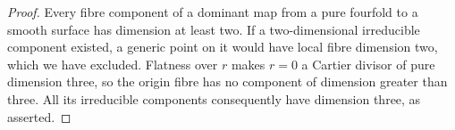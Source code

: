 \begin{proof}
Every fibre component of a dominant map from a
pure fourfold to a smooth surface has dimension
at least two. If a two-dimensional irreducible
component existed, a generic point on it would
have local fibre dimension two, which we have
excluded. Flatness over $r$ makes $r=0$ a
Cartier divisor of pure dimension three, so
the origin fibre has no component of dimension
greater than three. All its irreducible
components consequently have dimension three,
as asserted.
\end{proof}
